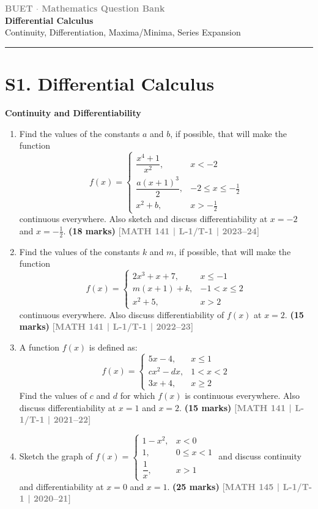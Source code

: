 \documentclass[12pt,a4paper]{article}
\newcommand{\yr}[1]{\hfill\textcolor{gray}{\small\textbf{[#1]}}}
\newcommand{\mk}[1]{\textcolor{orange!70!black}{\small\textbf{(#1 marks)}}}
\newcommand{\subtopic}[2]{%
  \vspace{10pt}
  \noindent\begin{tcolorbox}[colback=#1!8,colframe=#1,boxrule=0.6pt,arc=4pt,
    left=6pt,right=6pt,top=4pt,bottom=4pt]
    \small\bfseries\textcolor{#1}{#2}
  \end{tcolorbox}
  \vspace{2pt}
}
\newcommand{\secdivider}[3]{%
  \newpage\thispagestyle{empty}%
  \vspace*{\fill}%
  \begin{tcolorbox}[enhanced,colback=#3!6,colframe=#3,boxrule=1.5pt,arc=8pt,
    left=20pt,right=20pt,top=22pt,bottom=22pt,
    shadow={3pt}{-3pt}{0pt}{black!15}]
    \centering
    {\large\textcolor{gray}{\textbf{BUET $\cdot$ Mathematics Question Bank}}}\\[8pt]
    {\fontsize{26}{32}\selectfont\bfseries\textcolor{#3}{#1}}\\[6pt]
    {\fontsize{15}{19}\selectfont\textcolor{dgray}{#2}}\\[12pt]
    \textcolor{#3!60}{\rule{0.5\textwidth}{0.5pt}}
  \end{tcolorbox}%
  \vspace*{\fill}\newpage%
}
\begin{document}
\newpage
\secdivider{Differential Calculus}{Continuity, Differentiation, Maxima/Minima, Series Expansion}{cA}

\section{S1. Differential Calculus}
\label{sec:S1}

\subtopic{cA}{Continuity and Differentiability}
\label{sub:s1-cont}

\begin{enumerate}\item Find the values of the constants $a$ and $b$, if possible, that will make the function
\[
f(x)=\begin{cases}\dfrac{x^{4}+1}{x^{2}}, & x<-2\\[6pt] \dfrac{a(x+1)^{3}}{2}, & -2\le x\le-\tfrac{1}{2}\\[6pt] x^{2}+b, & x>-\tfrac{1}{2}\end{cases}
\]
continuous everywhere. Also sketch and discuss differentiability at $x=-2$ and $x=-\tfrac{1}{2}$.
\mk{18} \yr{MATH 141 | L-1/T-1 | 2023--24}

\item Find the values of the constants $k$ and $m$, if possible, that will make the function
\[
f(x)=\begin{cases}2x^{3}+x+7, & x\le -1\\ m(x+1)+k, & -1<x\le 2\\ x^{2}+5, & x>2\end{cases}
\]
continuous everywhere. Also discuss differentiability of $f(x)$ at $x=2$.
\mk{15} \yr{MATH 141 | L-1/T-1 | 2022--23}



\item A function $f(x)$ is defined as:
\[
f(x)=\begin{cases}5x-4, & x\le 1\\ cx^{2}-dx, & 1<x<2\\ 3x+4, & x\ge 2\end{cases}
\]
Find the values of $c$ and $d$ for which $f(x)$ is continuous everywhere. Also discuss differentiability at $x=1$ and $x=2$.
\mk{15} \yr{MATH 141 | L-1/T-1 | 2021--22}

\item Sketch the graph of $f(x)=\begin{cases}1-x^{2}, & x<0\\ 1, & 0\le x<1\\ \dfrac{1}{x}, & x>1\end{cases}$ and discuss continuity and differentiability at $x=0$ and $x=1$.
\mk{25} \yr{MATH 145 | L-1/T-1 | 2020--21}


\end{enumerate}
\end{document}
